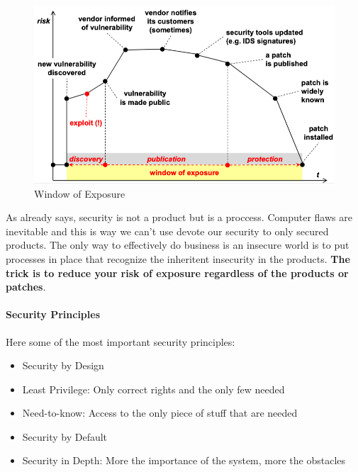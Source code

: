 \documentclass[12pt]{article}
\begin{document}
\begin{figure}[h!]
  \includegraphics[width=\linewidth]{images/window.png}
  \caption{Window of Exposure}
  \label{fig:window}
\end{figure}

As already says, security is not a product but is a proccess. Computer flaws are inevitable and this is way we can't use devote our security to only secured products. The only way to effectively do business is an insecure world is to put processes in place that recognize the inheritent insecurity in the products. \textbf{The trick is to reduce your risk of exposure regardless of the products or patches}.

\paragraph{Security Principles} Here some of the most important security principles:
\begin{itemize}
  \item Security by Design
  \item Least Privilege: Only correct rights and the only few needed
  \item Need-to-know: Access to the only piece of stuff that are needed
  \item Security by Default
  \item Security in Depth: More the importance of the system, more the obstacles
\end{itemize}
\end{document}
